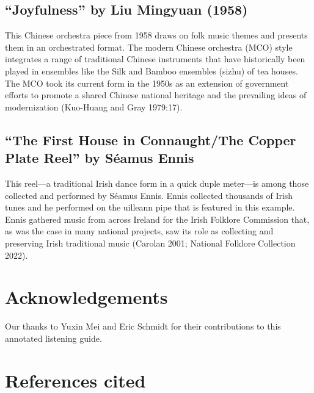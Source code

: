 \documentclass[twoside]{article}
\begin{document}
\hypertarget{joyfulness-by-liu-mingyuan-1958}{%
\subsection*{``Joyfulness'' by Liu Mingyuan
(1958)}\label{joyfulness-by-liu-mingyuan-1958}}

\sloppy
This Chinese orchestra piece from 1958 draws on folk music themes and
presents them in an orchestrated format. The modern Chinese orchestra
(MCO) style integrates a range of traditional Chinese instruments that
have historically been played in ensembles like the Silk and Bamboo
ensembles (sizhu) of tea houses. The MCO took its current form in the
1950s as an extension of government efforts to promote a shared Chinese
national heritage and the prevailing ideas of modernization (Kuo-Huang
and Gray 1979:17).~

\hypertarget{the-first-house-in-connaughtthe-copper-plate-reel-by-suxe9amus-ennis}{%
\subsection*{``The First House in Connaught/The Copper Plate Reel'' by
Séamus
Ennis}\label{the-first-house-in-connaughtthe-copper-plate-reel-by-suxe9amus-ennis}}

This reel---a traditional Irish dance form in a quick duple meter---is
among those collected and performed by Séamus Ennis. Ennis collected
thousands of Irish tunes and he performed on the uilleann pipe that is
featured in this example. Ennis gathered music from across Ireland for
the Irish Folklore Commission that, as was the case in many national
projects, saw its role as collecting and preserving Irish traditional
music (Carolan 2001; National Folklore Collection 2022).

\hypertarget{Acknowledgements}{%
\section*{Acknowledgements}\label{Acknowledgements}}

Our thanks to Yuxin Mei and Eric Schmidt for their contributions to this annotated listening guide.

\hypertarget{references-cited}{%
\section*{References cited}\label{references-cited}}
\end{document}

